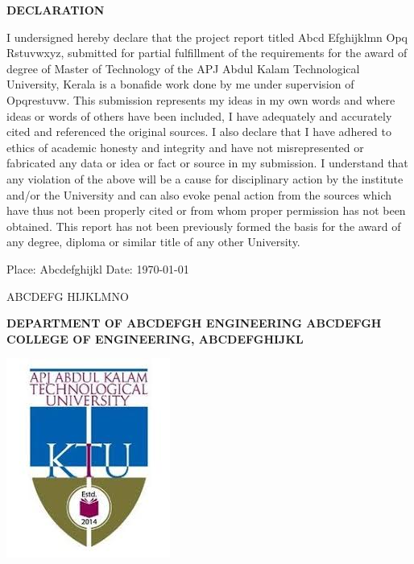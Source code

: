 \documentclass[12pt,a4paper]{report}
\def \reptitle{Abcd Efghijklmn Opq Rstuvwxyz}
\def \repauthor{ABCDEFG HIJKLMNO}
\def \repbranch{Abcdefgh Engineering}
\def \repcollege{Abcdefgh College Of Engineering}
\def \repplace{Abcdefghijkl}
\def \repsupervisor{Opqrestuvw}
\begin{document}


\clearpage
{}

\center\textbf{\Large DECLARATION}
\break

\justify 
{}I undersigned hereby declare that the project report titled \reptitle , submitted for partial fulfillment of the requirements for the award of degree of Master of Technology of the APJ Abdul Kalam Technological University, Kerala is a bonafide work done by me under supervision of \repsupervisor. This submission represents my ideas in my own words and where ideas or words of others have been included, I have adequately and accurately cited and referenced the original sources. I also declare that I have adhered to ethics of academic honesty and integrity and have not misrepresented or fabricated any data or idea or fact or source in my submission. I understand that any violation of the above will be a cause for disciplinary action by the institute and/or the University and can also evoke penal action from the sources which have thus not been properly cited or from whom proper permission has not been obtained. This report has not been previously formed the basis for the award of any degree, diploma or similar title of any other University. 

\begin{flushleft}                           
Place: \repplace \break
Date: \today
\end{flushleft}
\begin{flushright}   

\repauthor
\end{flushright} 

\newpage 

\center\textbf{\large \MakeUppercase{department of \repbranch } \break
\MakeUppercase{\repcollege, \repplace}}

\includegraphics[height=0.3\textwidth]{ktu_logo}\par 
\end{document}
